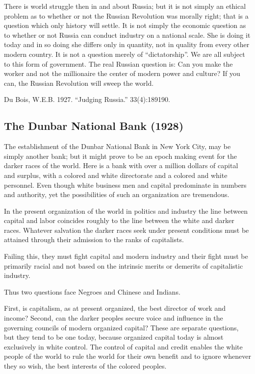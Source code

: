 \documentclass[letterpaper,10pt,english]{jupyterBook}
\begin{document}
\sphinxAtStartPar
There is world struggle then in and about Russia; but it is not simply an ethical problem as to whether or not the Russian Revolution was morally right; that is a question which only history will settle. It is not simply the economic question as to whether or not Russia can conduct industry on a national scale. She is doing it today and in so doing she differs only in quantity, not in quality from every other modern country. It is not a question merely of “dictatorship”. We are all subject to this form of government. The real Russian question is: Can you make the worker and not the millionaire the center of modern power and culture? If you can, the Russian Revolution will sweep the world.

\sphinxAtStartPar
{} Du Bois, W.E.B. 1927. “Judging Russia.”  33(4):189\sphinxhyphen{}190.


\subsection{The Dunbar National Bank (1928)}
\label{\detokenize{Volumes/35/11/dunbar_national_bank:the-dunbar-national-bank-1928}}\label{\detokenize{Volumes/35/11/dunbar_national_bank::doc}}
\sphinxAtStartPar
The establishment of the Dunbar National Bank in New York City, may be simply another bank; but it might prove to be an epoch making event for the darker races of the world. Here is a bank with over a million dollars of capital and surplus, with a colored and white directorate and a colored and white personnel. Even though white business men and capital predominate in numbers and authority, yet the possibilities of such an organization are tremendous.

\sphinxAtStartPar
In the present organization of the world in politics and industry the line between capital and labor coincides roughly to the line between the white and darker races. Whatever salvation the darker races seek under present conditions must be attained through their admission to the ranks of capitalists.

\sphinxAtStartPar
Failing this, they must fight capital and modern industry and their fight must be primarily racial and not based on the intrinsic merits or demerits of capitalistic industry.

\sphinxAtStartPar
Thus two questions face Negroes and Chinese and Indians.

\sphinxAtStartPar
First, is capitalism, as at present organized, the best director of work and income? Second, can the darker peoples secure voice and influence in the governing councils of modern organized capital? These are separate questions, but they tend to be one today, because organized capital today is almost exclusively in white control. The control of capital and credit enables the white people of the world to rule the world for their own benefit and to ignore whenever they so wish, the best interests of the colored peoples.
\end{document}
